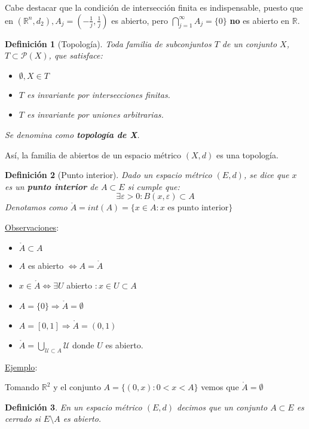 \documentclass[10pt,a4paper,openright]{book}
\theoremstyle{break}
\newtheorem*{defi}{Definición}
\begin{document}
Cabe destacar que la condición de intersección finita es indispensable, puesto que en $(\mathbb{R}^n, d_2), A_j=\left(-\frac{1}{j}, \frac{1}{j}\right)$ es abierto, pero $\displaystyle\bigcap_{j=1}^\infty A_j = \{0\}$  \textbf{no} es abierto en $\mathbb{R}$.

\begin{defi}[Topología]
Toda familia de subconjuntos $T$ de un conjunto $X$, $T \subset \mathcal P (X)$, que satisface:
\begin{itemize}
\item $\emptyset, X \in T$

\item $T$ es invariante por intersecciones finitas.

\item $T$ es invariante por uniones arbitrarias.
\end{itemize}

Se denomina como \textbf{topología de X}.
\end{defi}

 Así, la familia de abiertos de un espacio métrico $(X,d)$ es una topología.

\begin{defi}[Punto interior]
Dado un espacio métrico $(E,d)$, se dice que $x$ es un \textbf{punto interior} de $A \subset E$ si cumple que:
$$\exists \varepsilon > 0 : B(x, \varepsilon) \subset A$$
Denotamos como $\mathring{A} = int(A) = \{x \in A : x \mbox{ es punto interior}\}$
\end{defi}

\underline{Observaciones}:
\begin{itemize}
\item $\mathring{A} \subset A$
\item $A$ es abierto $\Leftrightarrow A = \mathring{A}$
\item $x \in \mathring{A} \Leftrightarrow \exists U$ abierto $: x \in U \subset A$
\item $A=\{0\}\Rightarrow \mathring{A} = \emptyset$
\item $A = [0,1]\Rightarrow\mathring{A} = (0,1)$
\item $\mathring{A} = \bigcup_{\mathcal{U} \subset A} \mathcal{U}$ donde $U$ es abierto.
\end{itemize}

\underline{Ejemplo}:

Tomando $\mathbb{R}^{2}$ y el conjunto $A =\{(0,x): 0 < x < A\}$ vemos que $\mathring{A} = \emptyset$

\begin{defi}
En un espacio métrico $(E,d)$ decimos que un conjunto $A\subset E$ es cerrado si $E\setminus{A}$ es abierto.
\end{defi}
\end{document}
